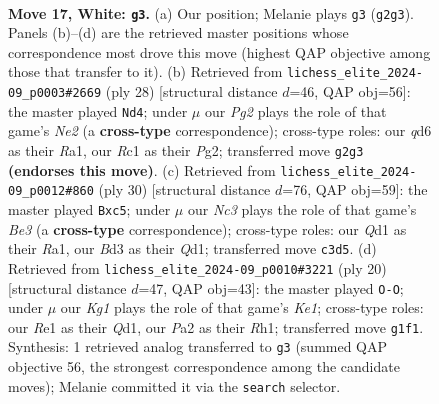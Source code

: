 \documentclass[11pt]{article}
\begin{document}
\begin{figure}[p]
\label{fig:thought-m30}
\end{figure}

\clearpage

\begin{figure}[p]\centering
\begin{subfigure}{0.46\textwidth}\centering
\resizebox{\linewidth}{!}{%
\newchessgame
\chessboard[
  setfen={r1b1k2r/pp1n3p/2pq2p1/3p2p1/3P4/2NBP3/PP3PPP/2RQR1K1 w k - 0 17},
  showmover=false,
  pgfstyle=straightmove, color=movearrow, markmove={g2-g3}
]}
\caption{}
\end{subfigure}\hfill
\begin{subfigure}{0.46\textwidth}\centering
\resizebox{\linewidth}{!}{%
\newchessgame
\chessboard[
  setfen={rnb1k2r/5ppp/p3p3/1pqpP3/5P2/P1PB4/1P2N1PP/R2QK2R w KQkq - 0 15},
  showmover=false,
  pgfstyle=straightmove, color=movearrow, markmove={e2-d4}
]}
\caption{}
\end{subfigure}
\\[4pt]
\begin{subfigure}{0.46\textwidth}\centering
\resizebox{\linewidth}{!}{%
\newchessgame
\chessboard[
  setfen={r3k2r/2q1nppp/p3p3/2ppPb2/8/1NP1B3/P4PPP/R2Q1RK1 w kq - 2 16},
  showmover=false,
  pgfstyle=straightmove, color=movearrow, markmove={e3-c5}
]}
\caption{}
\end{subfigure}\hfill
\begin{subfigure}{0.46\textwidth}\centering
\resizebox{\linewidth}{!}{%
\newchessgame
\chessboard[
  setfen={r1b1k2r/pp3ppp/2nqp3/3p4/3P4/2PBPN2/P4PPP/R2QK2R w KQkq - 0 11},
  showmover=false,
  pgfstyle=straightmove, color=movearrow, markmove={e1-g1}
]}
\caption{}
\end{subfigure}
\caption{\textbf{Move 17, White: \texttt{g3}.} (a) Our position; Melanie plays \texttt{g3} (\texttt{g2g3}). Panels (b)--(d) are the retrieved master positions whose correspondence most drove this move (highest QAP objective among those that transfer to it). (b) Retrieved from \texttt{lichess\_elite\_2024-09\_p0003\#2669} (ply 28) [structural distance $d$=46, QAP obj=56]: the master played \texttt{Nd4}; under $\mu$ our \emph{Pg2} plays the role of that game's \emph{Ne2} (a \textbf{cross-type} correspondence); cross-type roles: our \emph{q}d6 as their \emph{R}a1, our \emph{R}c1 as their \emph{P}g2; transferred move \texttt{g2g3} \textbf{(endorses this move)}. (c) Retrieved from \texttt{lichess\_elite\_2024-09\_p0012\#860} (ply 30) [structural distance $d$=76, QAP obj=59]: the master played \texttt{Bxc5}; under $\mu$ our \emph{Nc3} plays the role of that game's \emph{Be3} (a \textbf{cross-type} correspondence); cross-type roles: our \emph{Q}d1 as their \emph{R}a1, our \emph{B}d3 as their \emph{Q}d1; transferred move \texttt{c3d5}. (d) Retrieved from \texttt{lichess\_elite\_2024-09\_p0010\#3221} (ply 20) [structural distance $d$=47, QAP obj=43]: the master played \texttt{O-O}; under $\mu$ our \emph{Kg1} plays the role of that game's \emph{Ke1}; cross-type roles: our \emph{R}e1 as their \emph{Q}d1, our \emph{P}a2 as their \emph{R}h1; transferred move \texttt{g1f1}. Synthesis: 1 retrieved analog transferred to \texttt{g3} (summed QAP objective 56, the strongest correspondence among the candidate moves); Melanie committed it via the \texttt{search} selector.}

\end{figure}
\end{document}
